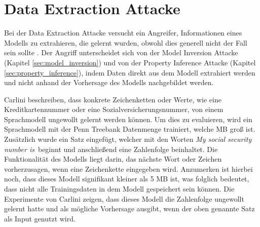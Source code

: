 \section{Data Extraction Attacke}\label{sec:data_ext}

Bei der Data Extraction Attacke versucht ein Angreifer, Informationen eines Modells zu extrahieren, die gelernt wurden, obwohl dies generell nicht der Fall sein sollte \cite{P-87}.
Der Angriff unterscheidet sich von der Model Inversion Attacke (Kapitel \ref{sec:model_inversion}) und von der Property Inference Attacke (Kapitel \ref{sec:property_inference}), indem Daten direkt aus dem Modell extrahiert werden und nicht anhand der Vorhersage des Modells nachgebildet werden.

Carlini \etal \cite{P-87} beschreiben, dass konkrete Zeichenketten oder Werte, wie eine Kreditkartennummer oder eine Sozialversicherungsnummer, von einem Sprachmodell ungewollt gelernt werden können.
Um dies zu evaluieren, wird ein Sprachmodell mit der Penn Treebank Datenmenge trainiert, welche  MB groß ist. 
Zusätzlich wurde ein Satz eingefügt, welcher mit den Worten \dq \textit{My social security number is}\dq\ beginnt und anschließend eine Zahlenfolge beinhaltet.
Die Funktionalität des Modells liegt darin, das nächste Wort oder Zeichen vorherzusagen, wenn eine Zeichenkette eingegeben wird.
Anzumerken ist hierbei noch, dass dieses Modell signifikant kleiner als 5 MB ist, was folglich bedeutet, dass nicht alle Trainingsdaten in dem Modell gespeichert sein können.
Die Experimente von Carlini \etal \cite{P-87} zeigen, dass dieses Modell die Zahlenfolge ungewollt gelernt hatte und als mögliche Vorhersage ausgibt, wenn der oben genannte Satz als Input genutzt wird.

